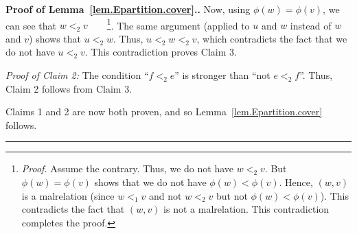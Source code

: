 \documentclass[numbers=enddot,12pt,final,onecolumn,notitlepage,abstracton]{scrartcl}%
\theoremstyle{definition}
\newenvironment{proof}[1][Proof]{\noindent\textbf{#1.} }{\ \rule{0.5em}{0.5em}}
\begin{document}
\begin{proof}[Proof of Lemma~\ref{lem.Epartition.cover}.]
Now, using $\phi\left(w\right) = \phi\left(v\right)$, we can
see that $w <_2 v$\ \ \ \ \footnote{\textit{Proof.} Assume
the contrary. Thus, we do not have $w <_2 v$. But
$\phi\left(w\right) = \phi\left(v\right)$ shows that we do not
have $\phi\left(w\right) < \phi\left(v\right)$. Hence,
$\left(w, v\right)$ is a malrelation (since $w <_1 v$ and not
$w <_2 v$ but not $\phi\left(w\right) < \phi\left(v\right)$).
This contradicts the fact that $\left(w, v\right)$ is not
a malrelation. This contradiction completes the proof.}.
The same argument (applied to $u$ and $w$ instead of $w$ and
$v$) shows that $u <_2 w$. Thus, $u <_2 w <_2 v$, which
contradicts the fact that we do not have $u <_2 v$. This
contradiction proves Claim 3.

\textit{Proof of Claim 2:} The condition ``$f <_2 e$'' is stronger
than ``not $e <_2 f$''. Thus, Claim 2 follows from Claim 3.

Claims 1 and 2 are now both proven, and so
Lemma~\ref{lem.Epartition.cover} follows.
\end{proof}
\end{document}
